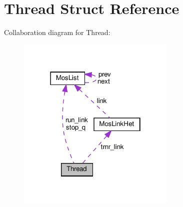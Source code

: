 \hypertarget{structThread}{}\section{Thread Struct Reference}
\label{structThread}


Collaboration diagram for Thread\+:\nopagebreak
\begin{figure}[H]
\begin{center}
\leavevmode
\includegraphics[width=214pt]{structThread__coll__graph}
\end{center}
\end{figure}
